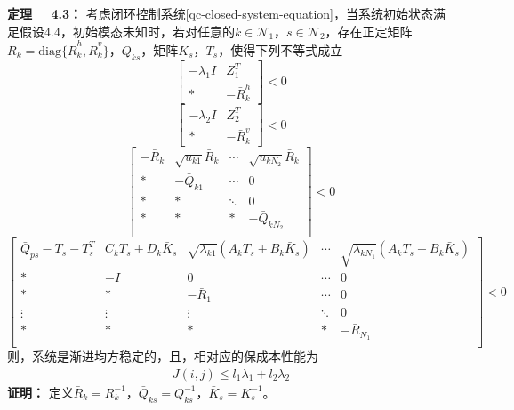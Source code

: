 	{\bf 定理 \ \ 4.3：}
	考虑闭环控制系统\eqref{qc-closed-system-equation}，当系统初始状态满足假设4.4，初始模态未知时，若对任意的$k\in\mathcal{N}_{1}$，$s\in\mathcal{N}_2$，存在正定矩阵$\bar{R}_{k}=\mathrm{diag}\{\bar{R}^{h}_{k},\bar{R}^{v}_{k}\}$，$\bar{Q}_{ks}$，矩阵$\bar{K}_{s}$，$T_{s}$，使得下列不等式成立
	\begin{equation}\label{qcT3C1}
	\begin{bmatrix}
	-\lambda_1I &Z^{T}_1\\
	*&-\bar{R}^{h}_{k}
	\end{bmatrix}<0
	\end{equation}
	\begin{equation}\label{qcT3C2}
	\begin{bmatrix}
	-\lambda_2I &Z^{T}_{2}\\
	*&-\bar{R}^{v}_{k}
	\end{bmatrix}<0
	\end{equation}
	\begin{equation}\label{qcT3C3}
	\begin{bmatrix}
	-\bar{R}_{k}& \sqrt{u_{k1}}\bar{R}_{k} &\cdots&\sqrt{u_{kN_2}}\bar{R}_{k}\\
	*&-\bar{Q}_{k1}&\cdots&0\\
	*&*&\ddots&0\\
	*&*&*&-\bar{Q}_{kN_2}\\
	\end{bmatrix}<0
	\end{equation}
	\begin{equation}\label{qcT3C4}
	\begin{bmatrix}
		\bar{Q}_{ps}-T_{s}-T^{T}_{s} & C_{k}T_s+D_k\bar{K}_s& \sqrt{\lambda_{k1}}(A_kT_s+B_k\bar{K}_s)&\cdots&\sqrt{\lambda_{kN_1}}(A_kT_s+B_k\bar{K}_s)\\
				*&-I&0&\cdots&0\\
				*&*&-\bar{R}_1&\cdots&0\\
				\vdots&\vdots&\vdots&\ddots&0\\
				*&*&*&*&-\bar{R}_{N_1}\\
				
	\end{bmatrix}<0
	\end{equation}	
	则，系统是渐进均方稳定的，且，相对应的保成本性能为
	\begin{equation}
	\begin{split}
	J(i,j) \leq l_1\lambda_1 + l_2\lambda_2
	\end{split}
	\end{equation}
	{\bf 证明：} 定义$\bar{R}_{k}=R^{-1}_{k}$，$\bar{Q}_{ks}=Q^{-1}_{ks}$，$\bar{K}_s=K^{-1}_s$。
